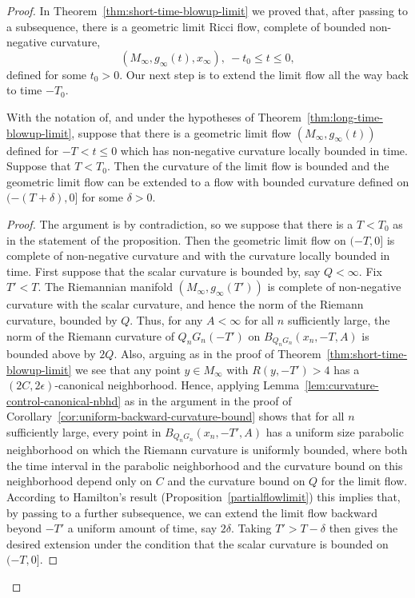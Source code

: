 \begin{proof}
In Theorem~\ref{thm:short-time-blowup-limit} we proved that, after passing to a
subsequence, there is a geometric limit Ricci flow, complete of
bounded non-negative curvature,
$$(M_\infty,g_\infty(t),x_\infty),\ -t_0\le t\le 0,$$
defined for some $t_0>0$. Our next step is to
extend the limit flow all the way back to time $-T_0$.

 \begin{proposition}
\label{prop:extend-limit-flow-backward}
\label{maxT}
With the notation of, and under the hypotheses of
Theorem~\ref{thm:long-time-blowup-limit}, suppose that there is a geometric limit flow
$(M_\infty,g_\infty(t))$ defined for $-T<t\le 0$ which has
non-negative curvature locally bounded in time. Suppose that
$T<T_0$. Then the curvature of the limit flow is bounded and the
geometric limit flow can be extended to a flow with bounded
curvature defined on $(-(T+\delta),0]$ for some $\delta>0$.
 \end{proposition}


\begin{proof}
 The
argument is by contradiction, so we suppose that there is a $T<T_0$
as in the statement of the proposition. Then the geometric limit
flow on $(-T,0]$ is complete of non-negative curvature and with the
curvature locally bounded in time. First suppose that the scalar
curvature is bounded by, say $Q<\infty$. Fix $T'<T$.
 The Riemannian manifold
$(M_\infty,g_\infty(T'))$ is complete of non-negative curvature with
the scalar curvature, and hence the norm of the Riemann curvature,
bounded by $Q$. Thus, for any $A<\infty$ for all $n$ sufficiently
large, the norm of the Riemann curvature of $Q_nG_n(-T')$ on
$B_{Q_nG_n}(x_n,-T,A)$ is bounded above by $2Q$. Also, arguing as in
the proof of Theorem~\ref{thm:short-time-blowup-limit} we see that any point $y\in
M_\infty$ with $R(y,-T')> 4$ has a $(2C,2\epsilon)$-canonical
neighborhood. Hence, applying Lemma~\ref{lem:curvature-control-canonical-nbhd} as in the
argument in the proof of
 Corollary~\ref{cor:uniform-backward-curvature-bound} shows that for all $n$ sufficiently large,
every point in $B_{Q_nG_n}(x_n,-T',A)$ has a uniform size parabolic
neighborhood on which the Riemann curvature is uniformly bounded,
where both the time interval in the parabolic neighborhood and the
curvature bound on this neighborhood depend only on $C$ and the
curvature bound on $Q$ for the limit flow. According to Hamilton's
result (Proposition~\ref{partialflowlimit}) this implies that, by
passing to a further subsequence, we can extend the limit flow
backward
 beyond $-T'$ a uniform amount of time, say $2\delta$. Taking $T'>T-\delta$
 then gives the desired extension under the condition that the
scalar curvature is bounded on $(-T,0]$.



\end{proof}
\end{proof}
